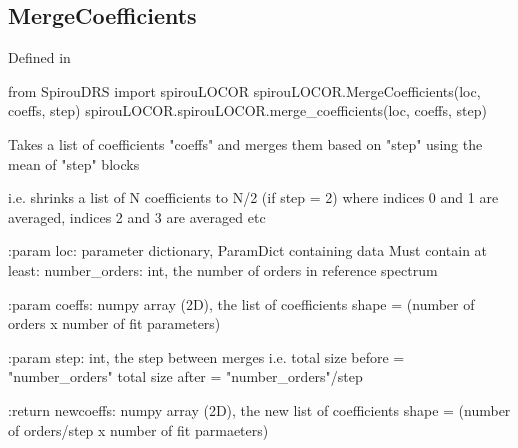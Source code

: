 \noindent\begin{minipage}{\textwidth}
\subsection{MergeCoefficients}

Defined in \spirouLOCOR{}

\begin{pythonbox}
from SpirouDRS import spirouLOCOR
spirouLOCOR.MergeCoefficients(loc, coeffs, step)
spirouLOCOR.spirouLOCOR.merge_coefficients(loc, coeffs, step)
\end{pythonbox}

\begin{pythondocstring}
Takes a list of coefficients "coeffs" and merges them based on "step"
using the mean of "step" blocks

i.e. shrinks a list of N coefficients to N/2 (if step = 2) where
     indices 0 and 1 are averaged, indices 2 and 3 are averaged etc

:param loc: parameter dictionary, ParamDict containing data
        Must contain at least:
            number_orders: int, the number of orders in reference spectrum

:param coeffs: numpy array (2D), the list of coefficients
               shape = (number of orders x number of fit parameters)

:param step: int, the step between merges
             i.e. total size before = "number_orders"
                  total size after = "number_orders"/step

:return newcoeffs: numpy array (2D), the new list of coefficients
            shape = (number of orders/step x number of fit parmaeters)
\end{pythondocstring}
\end{minipage}

